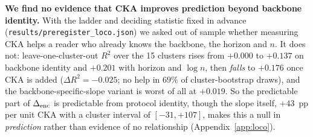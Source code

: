 \textbf{We find no evidence that CKA improves prediction beyond backbone identity.}  With
the ladder and deciding statistic fixed in advance
(\texttt{results/preregister\_loco.json}) we asked out of sample whether measuring
CKA helps a reader who already knows the backbone, the horizon and $n$.  It does
not: leave-one-cluster-out $R^2$ over the 15 clusters rises from $+0.000$ to
$+0.137$ on backbone identity and $+0.201$ with horizon and $\log n$, then
\emph{falls} to $+0.176$ once CKA is added ($\Delta R^2{=}{-}0.025$; no help in
$69\%$ of cluster-bootstrap draws), and the backbone-specific-slope variant is
worst of all at $+0.019$.  So the predictable part of $\Delta_\text{enc}$ is predictable from
protocol identity, though the slope itself, $+43$~pp per unit CKA with a cluster
interval of $[-31, +107]$, makes this a null in \emph{prediction} rather than
evidence of no relationship (Appendix~\ref{app:loco}).

%

